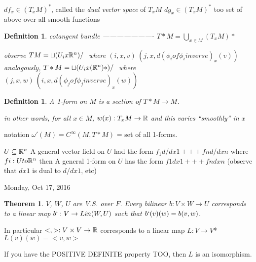 \documentclass[11pt,leqno,oneside]{amsart}
\newcommand{\x}{\times}
\theoremstyle{mystyle} \newtheorem{thrm}[thm]{Theorem}
\theoremstyle{mystyle} \newtheorem{defi}[thm]{Definition}
\begin{document}
$df_x \in (T_xM)^*$, called the \emph{dual vector space} of $T_xM$
$dg_x \in (T_xM)^*$ too
set of above over all smooth functions

\begin{defi}
	cotangent bundle
	----------------------
	$T*M = \bigcup_{x \in M} (T_xM)*$


	observe
	$TM = \sqcup (U_i x {\mathbb R}^n)/~$
	where $(i, x, v) ~ (j, x, d(\phi_i of \phi_i inverse)_x(v))$
	analagously,
	$T*M = \sqcup (U_i x ({\mathbb R}^n)*)/~$
	where $(j, x, w) ~ (i, x, d(\phi_j of \phi_j inverse)_x(w))$
\end{defi}
\begin{defi}
	A \emph{1-form} on $M$ is a section of $T*M \to M$.

	in other words, for all $x \in M$, $w(x): T_xM \to {\mathbb R}$ and this varies ``smoothly'' in $x$
\end{defi}
	notation
	$\omega'(M) = C^\infty(M, T*M)$ = set of all 1-forms.

\begin{example}
	$U \subseteq {\mathbb R}^n$
	A general vector field on $U$ had the form
	$f_1 d/dx1 +++ fn d/dxn$
	where $fi : U to {\mathbb R}^n$
	then
	A general 1-form on $U$ has the form
	$f1 dx1 +++ fn dxn$
	(observe that $dx1$ is dual to $d/dx1$, etc)
\end{example}
Monday, Oct 17, 2016

\begin{thrm}
	$V$, $W$, $U$ are V.S. over $F$.  Every bilinear $b:V \x W \to U$ corresponds to a linear map $b` : V \to Lin(W,U)$
	such that $b`(v)(w) = b(v,w)$.
\end{thrm}
	In particular $<,> : V \x V \to \R$
	corresponds to a linear map
	$L: V \to V$*
	$L(v)(w) = <v,w>$

	If you have the POSITIVE DEFINITE property TOO, then $L$ is an isomorphism.
\end{document}
